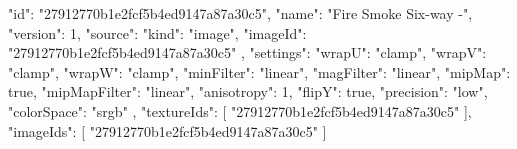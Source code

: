 {
  "id": "27912770b1e2fcf5b4ed9147a87a30c5",
  "name": "Fire Smoke Six-way -",
  "version": 1,
  "source": {
    "kind": "image",
    "imageId": "27912770b1e2fcf5b4ed9147a87a30c5"
  },
  "settings": {
    "wrapU": "clamp",
    "wrapV": "clamp",
    "wrapW": "clamp",
    "minFilter": "linear",
    "magFilter": "linear",
    "mipMap": true,
    "mipMapFilter": "linear",
    "anisotropy": 1,
    "flipY": true,
    "precision": "low",
    "colorSpace": "srgb"
  },
  "textureIds": [
    "27912770b1e2fcf5b4ed9147a87a30c5"
  ],
  "imageIds": [
    "27912770b1e2fcf5b4ed9147a87a30c5"
  ]
}
